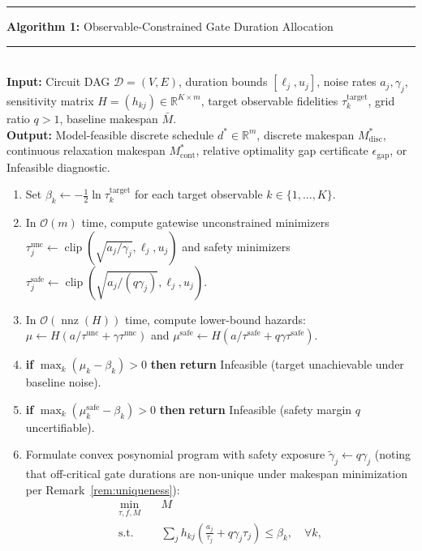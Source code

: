 \documentclass[10pt,letterpaper,journal]{IEEEtran}
\begin{document}
\begin{table}[t]
\hrule\vspace{3pt}
\noindent\textbf{Algorithm 1:} Observable-Constrained Gate Duration Allocation\\[-0.5em]
\rule{\columnwidth}{0.4pt}\\[0.2em]
\footnotesize
\textbf{Input:} Circuit DAG $\mathcal{D}=(V, E)$, duration bounds $[\ell_j, u_j]$, noise rates $a_j, \gamma_j$, sensitivity matrix $H = (h_{kj}) \in \mathbb{R}^{K \times m}$, target observable fidelities $\tau_k^{\mathrm{target}}$, grid ratio $q > 1$, baseline makespan $\bar{M}$.\\
\textbf{Output:} Model-feasible discrete schedule $d^* \in \mathbb{R}^m$, discrete makespan $M_{\mathrm{disc}}^*$, continuous relaxation makespan $M_{\mathrm{cont}}^*$, relative optimality gap certificate $\epsilon_{\mathrm{gap}}$, or Infeasible diagnostic.
\begin{enumerate}
\itemsep 0.05em
\item Set $\beta_k \gets -\frac{1}{2} \ln \tau_k^{\mathrm{target}}$ for each target observable $k \in \{1, \dots, K\}$.
\item In $\mathcal{O}(m)$ time, compute gatewise unconstrained minimizers $\tau_j^{\mathrm{unc}} \gets \operatorname{clip}(\sqrt{a_j/\gamma_j}, \ell_j, u_j)$ and safety minimizers $\tau_j^{\mathrm{safe}} \gets \operatorname{clip}(\sqrt{a_j/(q\gamma_j)}, \ell_j, u_j)$.
\item In $\mathcal{O}(\operatorname{nnz}(H))$ time, compute lower-bound hazards:
$\mu \gets H(a/\tau^{\mathrm{unc}} + \gamma\tau^{\mathrm{unc}})$ and $\mu^{\mathrm{safe}} \gets H(a/\tau^{\mathrm{safe}} + q\gamma\tau^{\mathrm{safe}})$.
\item \textbf{if} $\max_k (\mu_k - \beta_k) > 0$ \textbf{then} \textbf{return} Infeasible (target unachievable under baseline noise).
\item \textbf{if} $\max_k (\mu_k^{\mathrm{safe}} - \beta_k) > 0$ \textbf{then} \textbf{return} Infeasible (safety margin $q$ uncertifiable).
\item Formulate convex posynomial program with safety exposure $\tilde{\gamma}_j \gets q\gamma_j$ (noting that off-critical gate durations are non-unique under makespan minimization per Remark~\ref{rem:uniqueness}):
\begin{equation*}
\begin{aligned}
\min_{\tau, f, M} \quad & M\\
\text{s.t.} \quad & \sum_{j} h_{kj} \left(\frac{a_j}{\tau_j} + q\gamma_j \tau_j\right) \le \beta_k, \quad \forall k,\\

\end{aligned}
\end{equation*}
\end{enumerate}
\end{table}
\end{document}
